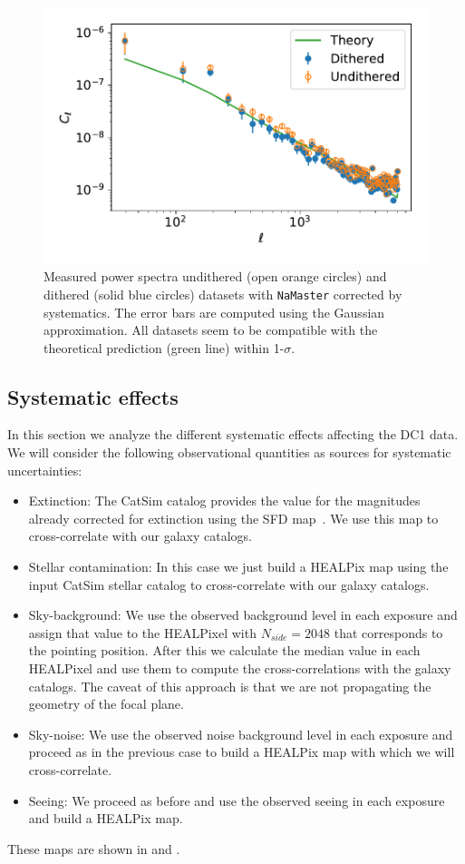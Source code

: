 \documentclass[\docopts]{\docclass}
\begin{document}
\begin{figure}
\centering
\includegraphics[width=0.9\columnwidth]{Cl_25p3_errors}
\caption{Measured power spectra undithered (open orange circles) and dithered (solid blue circles) datasets with \texttt{NaMaster} corrected by systematics. The error bars are computed using the Gaussian approximation. All datasets seem to be compatible with the theoretical prediction (green line) within 1-$\sigma$.}
\label{fig:power_spectra}
\end{figure}
\subsection{Systematic effects}
In this section we analyze the different systematic effects affecting the DC1 data. We will consider the following observational quantities as sources for systematic uncertainties:
\begin{itemize}
\item Extinction: The CatSim catalog provides the value for the magnitudes already corrected for extinction using the SFD map~\citep{1998ApJ...500..525S}. We use this map to cross-correlate with our galaxy catalogs.
\item Stellar contamination: In this case we just build a HEALPix map using the input CatSim stellar catalog to cross-correlate with our galaxy catalogs.
\item Sky-background: We use the observed background level in each exposure and assign that value to the HEALPixel with $N_{side}=2048$ that corresponds to the pointing position. After this we calculate the median value in each HEALPixel and use them to compute the cross-correlations with the galaxy catalogs. The caveat of this approach is that we are not propagating the geometry of the focal plane.
\item Sky-noise: We use the observed noise background level in each exposure and proceed as in the previous case to build a HEALPix map with which we will cross-correlate.
\item Seeing: We proceed as before and use the observed seeing in each exposure and build a HEALPix map.
\end{itemize}
These maps are shown in  and . 
\end{document}
